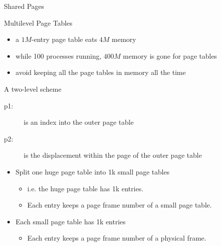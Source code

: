 \begin{frame}{Shared Pages}
  \begin{center}
  \end{center}
\end{frame}

\begin{frame}{Multilevel Page Tables}
  \begin{itemize}
  \item a $1M$-entry page table eats $4M$ memory
  \item while 100 processes running, $400M$ memory is gone for page tables
  \item avoid keeping all the page tables in memory all the time
  \end{itemize}
  \begin{iblock}{A two-level scheme}
    \begin{center}
    \end{center}
  \end{iblock}
\end{frame}

\begin{description}
\item[p1:] is an index into the outer page table
\item[p2:] is the displacement within the page of the outer page table
\end{description}

\begin{itemize}
\item Split one huge page table into 1k small page tables
  \begin{itemize}
  \item i.e. the huge page table has 1k entries.
  \item Each entry keeps a page frame number of a small page table.
  \end{itemize}
\item Each small page table has 1k entries
  \begin{itemize}
  \item Each entry keeps a page frame number of a physical frame.
  \end{itemize}
\end{itemize}

